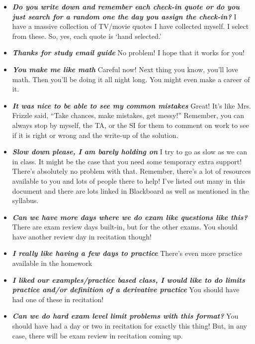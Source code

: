\documentclass[11pt,letterpaper]{article}
\begin{document}
\begin{itemize}
\item {\bfseries\itshape Do you write down and remember each check-in quote or do you just search for a random one the day you assign the check-in?} I have a massive collection of TV/movie quotes I have collected myself. I select from these. So, yes, each quote is `hand selected.' 

\item {\bfseries\itshape Thanks for study email guide} No problem! I hope that it works for you!

\item {\bfseries\itshape You make me like math} Careful now! Next thing you know, you'll love math. Then you'll be doing it all night long. You might even make a career of it. 

\item {\bfseries\itshape It was nice to be able to see my common mistakes} Great! It's like Mrs. Frizzle said, ``Take chances, make mistakes, get messy!'' Remember, you can always stop by myself, the TA, or the SI for them to comment on work to see if it is right or wrong and the write-up of the solution. 

\item {\bfseries\itshape Slow down please, I am barely holding on} I try to go as slow as we can in class. It might be the case that you need some temporary extra support! There's absolutely no problem with that. Remember, there's a lot of resources available to you and lots of people there to help! I've listed out many in this document and there are lots linked in Blackboard as well as mentioned in the syllabus. 

\item {\bfseries\itshape Can we have more days where we do exam like questions like this?} There are exam review days built-in, but for the other exams. You should have another review day in recitation though!

\item {\bfseries\itshape I really like having a few days to practice} There's even more practice available in the homework \Winkey

\item {\bfseries\itshape I liked our examples/practice based class, I would like to do limits practice and/or definition of a derivative practice} You should have had one of these in recitation! 

\item {\bfseries\itshape Can we do hard exam level limit problems with this format?} You should have had a day or two in recitation for exactly this thing! But, in any case, there will be exam review in recitation coming up. 


\end{itemize}
\end{document}

